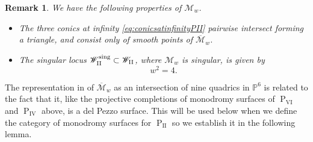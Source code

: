 \documentclass[a4paper,reqno]{amsart}
\numberwithin{equation}{section}
\newcommand{\p}{\mathbb{P}}
\newcommand{\pain}[1]{\operatorname{P}_{\mathrm{#1}}}
\newtheorem{remark}[theorem]{Remark}
\numberwithin{equation}{section}
\begin{document}
\begin{remark} \label{rem:propertiesofmonodromysurfacePII}
We have the following properties of $\mathcal{M}_w$.
    \begin{itemize}
        \item The three conics at infinity \eqref{eq:conicsatinfinityPII}
        pairwise intersect forming a triangle, and consist only of smooth points of $\overline{\mathcal{M}}_w$.
        \item The singular locus $\mathscr{W}^{\operatorname{sing}}_{\rm{II}}\subset \mathscr{W}_{\rm{II}}$, where $\mathcal{M}_w$ is singular, is given by $$w^2=4.$$
    \end{itemize}
\end{remark}




The representation in  of $\overline{\mathcal{M}}_w$ as an intersection of nine quadrics in $\p^6$ is related to the fact that it, like the projective completions of monodromy surfaces of $\pain{VI}$ and $\pain{IV}$ above, is a del Pezzo surface. 
This will be used below when we define the category of monodromy surfaces for $\pain{II}$ so we establish it in the following lemma.
\end{document}
